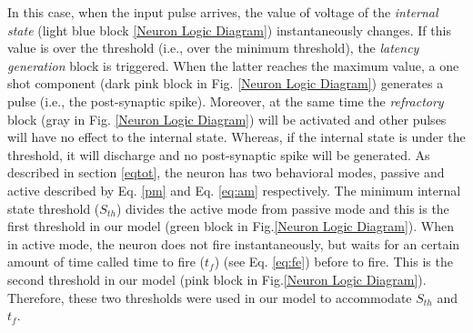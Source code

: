 \documentclass[review]{elsarticle}
\begin{document}
In this case, when the input pulse arrives, the value of voltage of the \emph{internal state} (light blue block \ref{Neuron Logic Diagram})  instantaneously changes. If this value is over the threshold (i.e., over the minimum threshold), the \emph{latency generation} block is triggered. When the latter reaches the maximum value, a one shot component (dark pink block in Fig. \ref{Neuron Logic Diagram}) generates a pulse (i.e., the post-synaptic spike). Moreover, at the same time the \emph{refractory} block (gray in Fig. \ref{Neuron Logic Diagram}) will be activated and other pulses will have no effect to the internal state. Whereas, if the internal state is under the threshold, it will discharge and no post-synaptic spike will be generated.
%
As described in section \ref{eqtot}, the neuron has two behavioral modes, passive and active described by  Eq. \ref{pm} and  Eq. \ref{eq:am} respectively. The minimum internal state threshold ($S_{th}$) divides the active mode from passive mode  and this is the first threshold in our model (green block in Fig.\ref{Neuron Logic Diagram}). When in active mode, the neuron does not fire instantaneously, but waits for an certain amount of time called time to fire ($t_f$) (see Eq. \ref{eq:fe}) before to fire. This is the second threshold in our model (pink block in Fig.\ref{Neuron Logic Diagram}). Therefore, these two thresholds were used in our model to accommodate $S_{th}$ and $t_f$.
 
\end{document}
